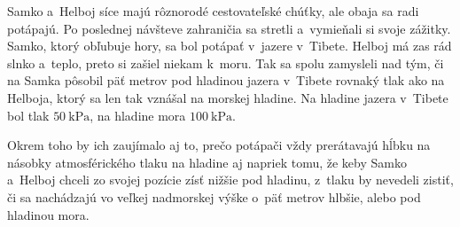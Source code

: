 Samko a~Helboj síce majú rôznorodé cestovateľské chúťky, ale obaja sa radi potápajú.
Po poslednej návšteve zahraničia sa stretli a~vymieňali si svoje zážitky. Samko, ktorý obľubuje hory, sa bol potápať v~jazere v~Tibete.
Helboj má zas rád slnko a~teplo, preto si zašiel niekam k~moru. Tak sa spolu zamysleli nad tým, či na Samka pôsobil päť metrov pod hladinou
jazera v~Tibete rovnaký tlak ako na Helboja, ktorý sa len tak vznášal na morskej hladine.
Na hladine jazera v~Tibete bol tlak $\SI{50}{\kilo\pascal}$, na hladine mora $\SI{100}{\kilo\pascal}$.

Okrem toho by ich zaujímalo aj to, prečo potápači vždy prerátavajú hĺbku na násobky atmosférického tlaku
na hladine aj napriek tomu, že keby Samko a~Helboj chceli zo svojej pozície zísť nižšie pod hladinu,
z~tlaku by nevedeli zistiť, či sa nachádzajú vo veľkej nadmorskej výške o~päť metrov hlbšie, alebo pod hladinou mora.
